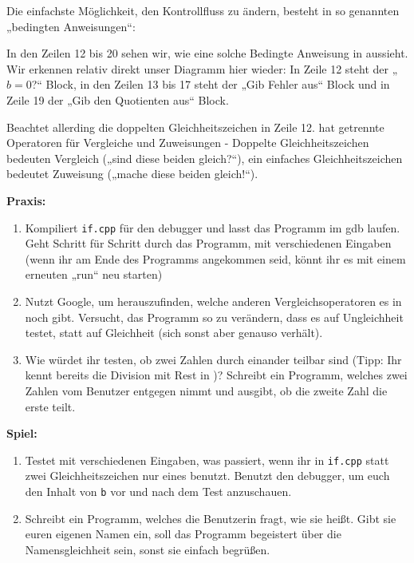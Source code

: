 Die einfachste Möglichkeit, den Kontrollfluss zu ändern, besteht in so
genannten „bedingten Anweisungen“:

In den Zeilen 12 bis 20 sehen wir, wie eine solche Bedingte Anweisung in \Cpp
aussieht. Wir erkennen relativ direkt unser Diagramm hier wieder: In Zeile 12
steht der „$b=0$?“ Block, in den Zeilen 13 bis 17 steht der „Gib Fehler aus“
Block und in Zeile 19 der „Gib den Quotienten aus“ Block.

Beachtet allerding die doppelten Gleichheitszeichen in Zeile 12. \Cpp hat
getrennte Operatoren für Vergleiche und Zuweisungen - Doppelte
Gleichheitszeichen bedeuten Vergleich („sind diese beiden gleich?“), ein
einfaches Gleichheitszeichen bedeutet Zuweisung („mache diese beiden gleich!“).

\textbf{Praxis:}
\begin{enumerate}
    \item Kompiliert \texttt{if.cpp} für den debugger und lasst das Programm im
        gdb laufen. Geht Schritt für Schritt durch das Programm, mit
        verschiedenen Eingaben (wenn ihr am Ende des Programms angekommen seid,
        könnt ihr es mit einem erneuten „run“ neu starten)
    \item Nutzt Google, um herauszufinden, welche anderen Vergleichsoperatoren
        es in \Cpp noch gibt. Versucht, das Programm so zu verändern, dass es
        auf Ungleichheit testet, statt auf Gleichheit (sich sonst aber genauso
        verhält).
    \item Wie würdet ihr testen, ob zwei Zahlen durch einander teilbar sind
        (Tipp: Ihr kennt bereits die Division mit Rest in \Cpp)? Schreibt ein
        Programm, welches zwei Zahlen vom Benutzer entgegen nimmt und ausgibt,
        ob die zweite Zahl die erste teilt.
\end{enumerate}

\textbf{Spiel:}
\begin{enumerate}
    \item Testet mit verschiedenen Eingaben, was passiert, wenn ihr in
        \texttt{if.cpp} statt zwei Gleichheitszeichen nur eines benutzt.
        Benutzt den debugger, um euch den Inhalt von \texttt{b} vor und nach
        dem Test anzuschauen.
    \item Schreibt ein Programm, welches die Benutzerin fragt, wie sie heißt.
        Gibt sie euren eigenen Namen ein, soll das Programm begeistert über die
        Namensgleichheit sein, sonst sie einfach begrüßen.
\end{enumerate}
